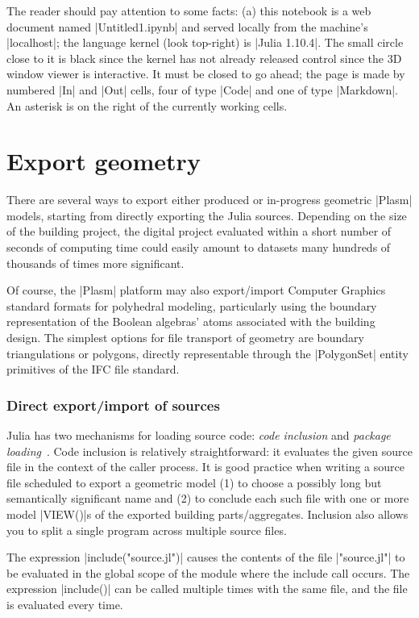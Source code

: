 \begin{coding}
The reader should pay attention to some facts: (a) this notebook is a web document named |Untitled1.ipynb| and served locally from the machine’s |localhost|; the language kernel (look top-right) is |Julia 1.10.4|. The small circle close to it is black since the kernel has not already released control since the 3D window viewer is interactive. It must be closed to go ahead; the page is made by numbered |In| and |Out| cells, four of type |Code| and one of type |Markdown|. An asterisk is on the right of the currently working cells.

\section{Export geometry}\label{sect:4-6}

There are several ways to export either produced or in-progress geometric |Plasm| models, starting from directly exporting the Julia sources. Depending on the size of the building project, the digital project evaluated within a short number of seconds of computing time could easily amount to datasets many hundreds of thousands of times more significant. 

Of course, the |Plasm| platform may also export/import Computer Graphics standard formats for polyhedral modeling, particularly using the boundary representation of the Boolean algebras’ atoms associated with the building design. The simplest options for file transport of geometry are boundary triangulations or polygons, directly representable through the |PolygonSet| entity primitives of the IFC file standard.

\subsubsection*{Direct export/import of sources}\label{sect:4-6-1}

Julia has two mechanisms for loading source code: \emph{code inclusion} and \emph{package loading}~\cite{}.
Code inclusion is relatively straightforward: it evaluates the given source file in the context of the caller process. It is good practice when writing a source file scheduled to export a geometric model (1) to choose a possibly long but semantically significant name and (2) to conclude each such file with one or more model |VIEW()|s of the exported building parts/aggregates. Inclusion also allows you to split a single program across multiple source files.

The expression |include("source.jl")| causes the contents of the file |"source.jl"| to be evaluated in the global scope of the module where the include call occurs. The expression |include()| can be called multiple times with the same file, and the file is evaluated every time. 


\end{coding}
